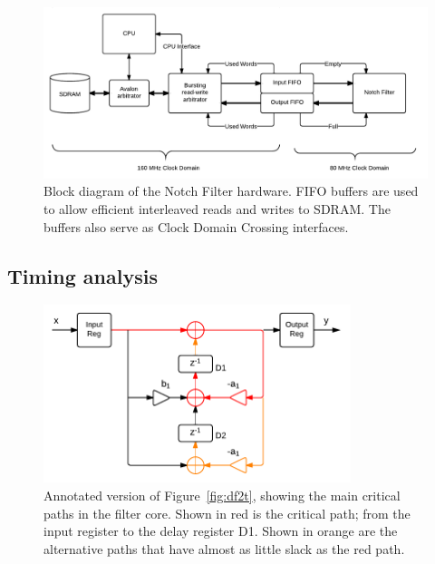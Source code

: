 \documentclass[]{article}
\begin{document}
\begin{landscape}
\begin{figure}[p]
	\begin{center}
		\includegraphics[width = 1.45\textwidth]{DSDNotch.pdf}
	\end{center}
	\caption{Block diagram of the Notch Filter hardware. FIFO buffers are used to allow efficient interleaved reads and writes to SDRAM. The buffers also serve as Clock Domain Crossing interfaces.}
	\label{fig:DSDNotch}
\end{figure}
\end{landscape}




\subsection{Timing analysis} %
\label{sub:timing_analysis}

\begin{figure}[tbp]
	\begin{center}
		\includegraphics[width = 0.8\textwidth]{DirectFormIITransposedCritpath.pdf}
	\end{center}
	\caption{Annotated version of Figure~\ref{fig:df2t}, showing the main critical paths in the filter core. Shown in red is the critical path; from the input register to the delay register D1. Shown in orange are the alternative paths that have almost as little slack as the red path.}
	\label{fig:df2tCritpath}
\end{figure}
\end{document}
